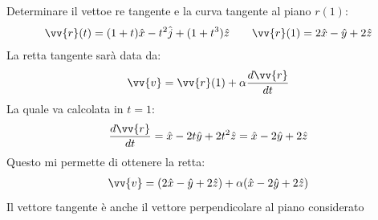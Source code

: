 \documentclass[a4paper, oneside]{article}
\begin{document}
\begin{example}
    Determinare il vettoe
    re tangente e la curva tangente al piano $r(1)$:
    \begin{gather*}
        \vv{r}(t) = (1 + t)\hat{x} - t^{2} \hat{j} + (1 + t^{3}) \hat{z} \qquad \vv{r}(1) = 2\hat{x} - \hat{y} + 2\hat{z}       
    \end{gather*}
    La retta tangente sarà data da:
    \begin{gather*}
        \vv{v}  = \vv{r}(1) + \alpha \frac{d\vv{r} }{dt} 
    \end{gather*}
    La quale va calcolata in $t = 1$:
    \begin{gather*}
        \frac{d\vv{r} }{dt} = \hat{x} - 2t\hat{y}   + 2t^{2}\hat{z} = \hat{x} - 2\hat{y} + 2\hat{z}   
    \end{gather*}
    Questo mi permette di ottenere la retta:
    \begin{gather*}
        \vv{v} =  (2\hat{x} - \hat{y} + 2\hat{z }   ) + \alpha (\hat{x} - 2\hat{y} + 2\hat{z}   )
    \end{gather*}
    Il vettore tangente è anche il vettore perpendicolare al piano considerato 
\end{example}
\end{document}
